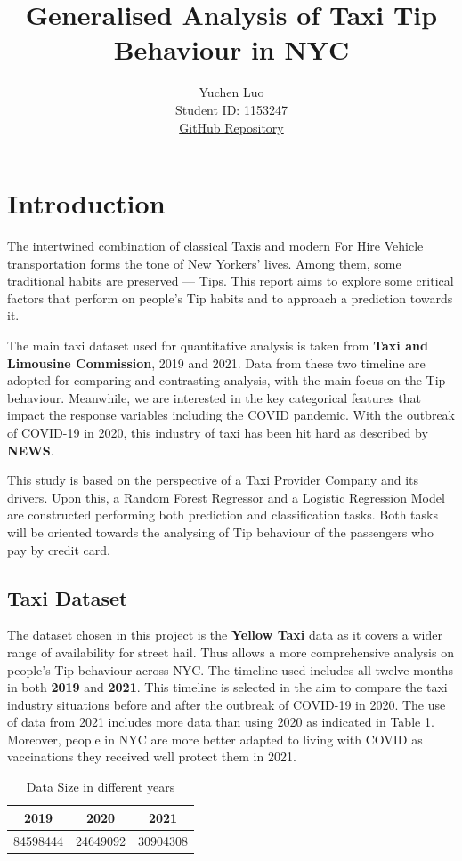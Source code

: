 \documentclass[11pt]{article}
\title{\textbf{Generalised Analysis of Taxi Tip Behaviour in NYC}}
\author{
Yuchen Luo \\
Student ID: 1153247 \\
\href{https://github.com/MAST30034-Applied-Data-Science/mast30034-project-1-BloodyHandsome}{GitHub Repository}
}
\begin{document}
\maketitle

\section{Introduction}
The intertwined combination of classical Taxis and modern For Hire Vehicle transportation forms the tone of New Yorkers' lives. Among them, some traditional habits are preserved --- Tips. This report aims to explore some critical factors that perform on people's Tip habits and to approach a prediction towards it. 


The main taxi dataset used for quantitative analysis is taken from \textbf{Taxi and Limousine Commission}\cite{2}, 2019 and 2021. Data from these two timeline are adopted for comparing and contrasting analysis, with the main focus on the Tip behaviour. Meanwhile, we are interested in the key categorical features that impact the response variables including the COVID pandemic. With the outbreak of COVID-19 in 2020, this industry of taxi has been hit hard as described by \textbf{NEWS}\cite{1}. 

This study is based on the perspective of a Taxi Provider Company and its drivers. Upon this, a Random Forest Regressor and a Logistic Regression Model are constructed performing both prediction and classification tasks. Both tasks will be oriented towards the analysing of Tip behaviour of the passengers who pay by credit card.

\subsection{Taxi Dataset}
The dataset chosen in this project is the \textbf{Yellow Taxi} data as it covers a wider range of availability for street hail. Thus allows a more comprehensive analysis on people's Tip behaviour across NYC. The timeline used includes all twelve months in both \textbf{2019} and \textbf{2021}. This timeline is selected in the aim to compare the taxi industry situations before and after the outbreak of COVID-19 in 2020. The use of data from 2021 includes more data than using 2020 as indicated in Table \ref{table:1}. Moreover, people in NYC are more better adapted to living with COVID as vaccinations they received well protect them in 2021\cite{3}.

\begin{table}[h!]
\centering
    \begin{tabular}{||c c c||}
    \hline\hline
    2019 & 2020 & 2021 \\ [0.5ex] 
    \hline
    84598444 & 24649092 & 30904308 \\ 
    \hline
    \end{tabular}
\caption{Data Size in different years}
\label{table:1}
\end{table}
\end{document}

